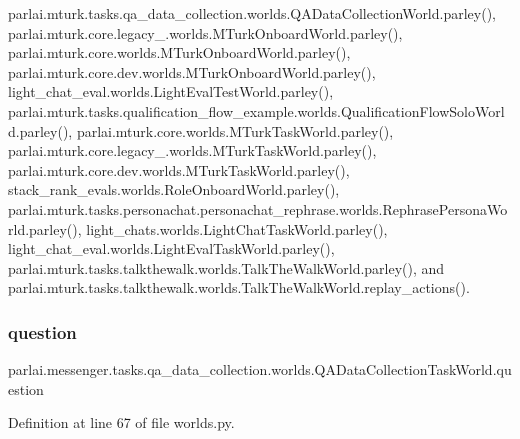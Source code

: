 parlai.\+mturk.\+tasks.\+qa\+\_\+data\+\_\+collection.\+worlds.\+Q\+A\+Data\+Collection\+World.\+parley(), parlai.\+mturk.\+core.\+legacy\+\_.\+worlds.\+M\+Turk\+Onboard\+World.\+parley(), parlai.\+mturk.\+core.\+worlds.\+M\+Turk\+Onboard\+World.\+parley(), parlai.\+mturk.\+core.\+dev.\+worlds.\+M\+Turk\+Onboard\+World.\+parley(), light\+\_\+chat\+\_\+eval.\+worlds.\+Light\+Eval\+Test\+World.\+parley(), parlai.\+mturk.\+tasks.\+qualification\+\_\+flow\+\_\+example.\+worlds.\+Qualification\+Flow\+Solo\+World.\+parley(), parlai.\+mturk.\+core.\+worlds.\+M\+Turk\+Task\+World.\+parley(), parlai.\+mturk.\+core.\+legacy\+\_.\+worlds.\+M\+Turk\+Task\+World.\+parley(), parlai.\+mturk.\+core.\+dev.\+worlds.\+M\+Turk\+Task\+World.\+parley(), stack\+\_\+rank\+\_\+evals.\+worlds.\+Role\+Onboard\+World.\+parley(), parlai.\+mturk.\+tasks.\+personachat.\+personachat\+\_\+rephrase.\+worlds.\+Rephrase\+Persona\+World.\+parley(), light\+\_\+chats.\+worlds.\+Light\+Chat\+Task\+World.\+parley(), light\+\_\+chat\+\_\+eval.\+worlds.\+Light\+Eval\+Task\+World.\+parley(), parlai.\+mturk.\+tasks.\+talkthewalk.\+worlds.\+Talk\+The\+Walk\+World.\+parley(), and parlai.\+mturk.\+tasks.\+talkthewalk.\+worlds.\+Talk\+The\+Walk\+World.\+replay\+\_\+actions().

\mbox{\label{classparlai_1_1messenger_1_1tasks_1_1qa__data__collection_1_1worlds_1_1QADataCollectionTaskWorld_adc62351cf97c0e7a98936264d371e583}} 
\subsubsection{\texorpdfstring{question}{question}}
{\footnotesize\ttfamily parlai.\+messenger.\+tasks.\+qa\+\_\+data\+\_\+collection.\+worlds.\+Q\+A\+Data\+Collection\+Task\+World.\+question}



Definition at line 67 of file worlds.\+py.



